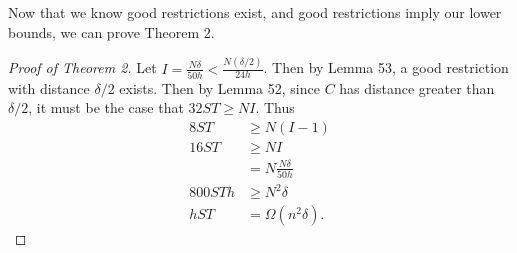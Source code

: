 \documentclass[10pt,a4paper]{article}
\begin{document}
Now that we know good restrictions exist, and good restrictions imply our lower bounds, we can prove Theorem 2.
\begin{proof}[Proof of Theorem 2]
Let $I=\frac{N\delta}{50h}<\frac{N(\delta/2)}{24h}$. Then by Lemma 53, a good restriction with distance $\delta/2$ exists. Then by Lemma 52, since $C$ has distance greater than $\delta/2$, it must be the case that $32ST\ge NI$. Thus
\begin{align*}8ST&\ge N(I-1)\\16ST&\ge NI\\&=N\frac{N\delta}{50h}\\800STh&\ge N^2\delta\\hST&=\Omega(n^2\delta).\end{align*}
\end{proof}
\end{document}
